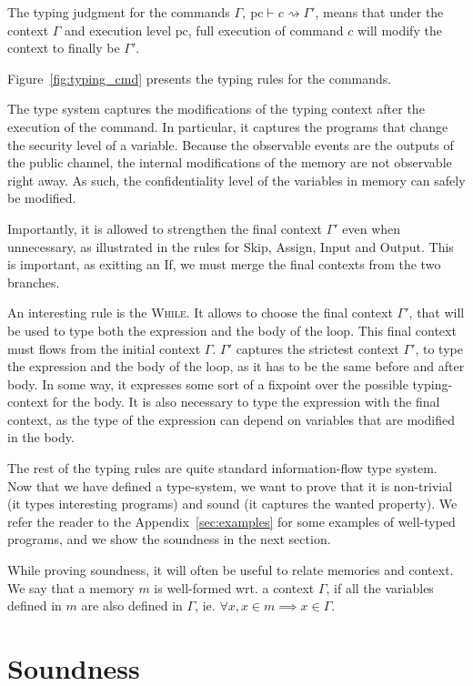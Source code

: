 \documentclass[10pt]{article}
\newcommand{\pc}{\mathrm{pc}}
\newcommand{\ctx}{\Gamma}
\newcommand{\typing}[4]{ #1,~#2 \vdash #3 \rightsquigarrow #4}
\begin{document}
The typing judgment for the commands \( \typing{\ctx}{\pc}{c}{\ctx'} \), means that under the context
\( \ctx \) and execution level \( \pc \), full execution of command \( c \) will modify the context to finally be $\ctx'$. 

Figure~\ref{fig:typing_cmd} presents the typing rules for the commands.


The type system captures the modifications of the typing context after the execution of the command.
In particular, it captures the programs that change the security level of a variable. Because the
observable events are the outputs of the public channel, the internal modifications of the memory are
not observable right away. As such, the confidentiality level of the variables in memory can safely
be modified.

Importantly, it is allowed to strengthen the final context \( \ctx' \) even when unnecessary, as illustrated in the rules for Skip, Assign, Input and Output. This is important, as exitting an If, we must merge the final contexts from the two branches.

An interesting rule is the \textsc{While}. It allows to choose the final context $\ctx'$, that will
be used to type both the expression and the body of the loop. This final context must flows from the
initial context $\ctx$.
$\ctx'$ captures the strictest context $\ctx'$, to type the expression and the
body of the loop, as it has to be the same before and after body. In some way, it expresses some
sort of a fixpoint over the possible typing-context for the body. It is also necessary to type the
expression with the final context, as the type of the expression can depend on variables that are
modified in the body.

The rest of the typing rules are quite standard information-flow type system. Now that we have
defined a type-system, we want to prove that it is non-trivial (it types interesting programs) and
sound (it captures the wanted property). We refer the reader to the
Appendix~\ref{sec:examples} for some examples of well-typed programs, and we show the soundness in
the next section.

While proving soundness, it will often be useful to relate memories and context. 
We say that a memory $m$ is well-formed wrt. a context $\ctx$, if
all the variables defined in $m$
are also defined in $\ctx$, ie. $\forall x, x \in m \implies x \in \ctx$.

\section{Soundness}%
\label{sec:soundness}
\end{document}
